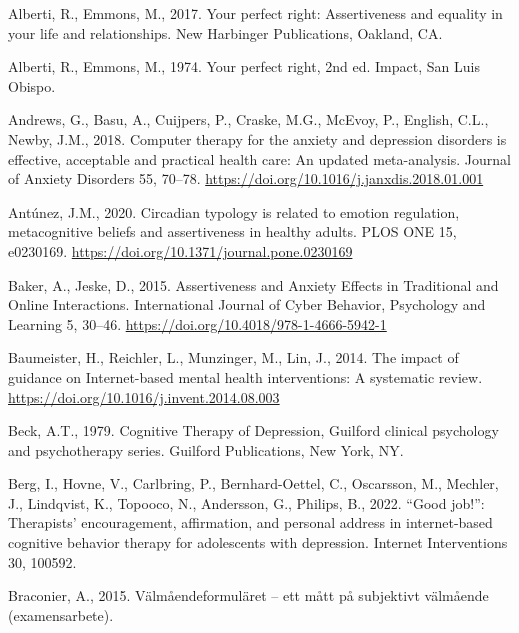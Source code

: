 \documentclass[3p]{elsarticle} %
\newlength{\cslhangindent}
\newlength{\cslentryspacingunit} %
\newenvironment{CSLReferences}[2] %
 {%
  \setlength{\parindent}{0pt}
  \ifodd #1
  \let\oldpar\par
  \def\par{\hangindent=\cslhangindent\oldpar}
  \fi
  \setlength{\parskip}{#2\cslentryspacingunit}
 }%
 {}
\begin{document}
\hypertarget{refs}{}
\begin{CSLReferences}{1}{0}
\leavevmode{}%
Alberti, R., Emmons, M., 2017. {Your perfect right: Assertiveness and
equality in your life and relationships}. New Harbinger Publications,
Oakland, CA.

\leavevmode{}%
Alberti, R., Emmons, M., 1974. {Your perfect right}, 2nd ed. Impact, San
Luis Obispo.

\leavevmode{}%
Andrews, G., Basu, A., Cuijpers, P., Craske, M.G., McEvoy, P., English,
C.L., Newby, J.M., 2018. {Computer therapy for the anxiety and
depression disorders is effective, acceptable and practical health care:
An updated meta-analysis}. Journal of Anxiety Disorders 55, 70--78.
\url{https://doi.org/10.1016/j.janxdis.2018.01.001}

\leavevmode{}%
Antúnez, J.M., 2020. Circadian typology is related to emotion
regulation, metacognitive beliefs and assertiveness in healthy adults.
PLOS ONE 15, e0230169.
\url{https://doi.org/10.1371/journal.pone.0230169}

\leavevmode{}%
Baker, A., Jeske, D., 2015. {Assertiveness and Anxiety Effects in
Traditional and Online Interactions}. International Journal of Cyber
Behavior, Psychology and Learning 5, 30--46.
\url{https://doi.org/10.4018/978-1-4666-5942-1}

\leavevmode{}%
Baumeister, H., Reichler, L., Munzinger, M., Lin, J., 2014. {The impact
of guidance on Internet-based mental health interventions: A systematic
review}. \url{https://doi.org/10.1016/j.invent.2014.08.003}

\leavevmode{}%
Beck, A.T., 1979. {Cognitive Therapy of Depression}, Guilford clinical
psychology and psychotherapy series. Guilford Publications, New York,
NY.

\leavevmode{}%
Berg, I., Hovne, V., Carlbring, P., Bernhard-Oettel, C., Oscarsson, M.,
Mechler, J., Lindqvist, K., Topooco, N., Andersson, G., Philips, B.,
2022. {``Good job!''}: Therapists' encouragement, affirmation, and
personal address in internet-based cognitive behavior therapy for
adolescents with depression. Internet Interventions 30, 100592.

\leavevmode{}%
Braconier, A., 2015. {V{ä}lm{å}endeformul{ä}ret -- ett m{å}tt p{å}
subjektivt v{ä}lm{å}ende (examensarbete)}.


\end{CSLReferences}
\end{document}
